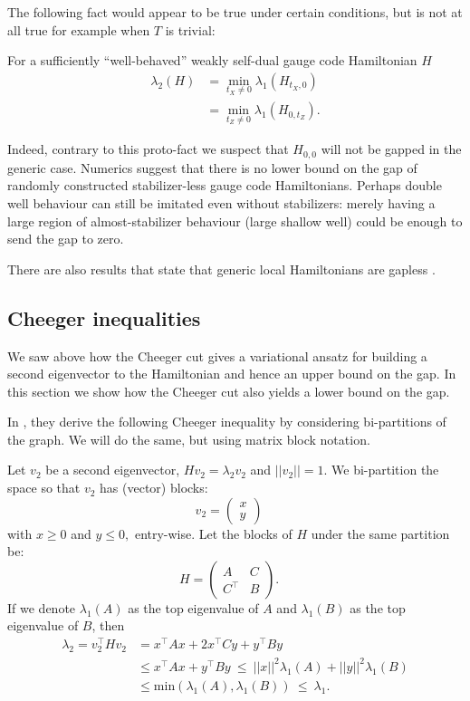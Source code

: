 \documentclass[11pt,oneside]{article}
\def\Ham{H}
\renewenvironment{framed}
{\begin{samepage}
\MakeFramed{\hsize0.8\linewidth\advance\hsize-\width\FrameRestore}}
{\endMakeFramed\end{samepage}}
\begin{document}
The following fact would appear to be true under certain conditions,
but is not at all true for example when $T$ is trivial:
\begin{framed}
For a sufficiently ``well-behaved''
weakly self-dual
gauge code Hamiltonian $H$
\begin{align*}
\lambda_2(\Ham) 
    &= \min_{t_X\ne 0} \lambda_1(\Ham_{t_X,0})\\
    &= \min_{t_Z\ne 0} \lambda_1(\Ham_{0,t_Z}).
\end{align*}
\end{framed}
Indeed, contrary to this proto-fact
we suspect that $H_{0,0}$ will not be gapped in
the generic case. 
Numerics suggest that
there is no lower bound on the gap of 
randomly constructed stabilizer-less gauge code Hamiltonians.
Perhaps double well behaviour can still be imitated even without
stabilizers: merely having a large region of almost-stabilizer
behaviour (large shallow well) could be enough to send the gap to zero.

There are also results that state that generic 
local Hamiltonians are gapless \cite{Movassagh2016}.

\subsection{Cheeger inequalities}

We saw above how the Cheeger cut gives a variational ansatz
for building a second eigenvector to the Hamiltonian and hence
an upper bound on the gap.
In this section we show how the Cheeger cut also 
yields a lower bound on the gap.

In \cite{Friedland2002}, they derive the following Cheeger inequality
by considering bi-partitions of the graph. We will do the
same, but using matrix block notation.

Let $v_2$ be a second eigenvector, $ \Ham v_2 = \lambda_2 v_2 $ 
and $||v_2||=1$.
We bi-partition the space 
so that $v_2$ has (vector) blocks:
$$
v_2 = \left( \begin{array}{l}
x\\
y\end{array} \right)\quad
$$
with $x\ge 0$ and $y\le 0,$ entry-wise.
Let the blocks of $\Ham$ under the same partition be:
$$
\Ham = \left( \begin{array}{ll}
A&C\\
C^\top&B\end{array} \right).\quad
$$
If we denote $\lambda_1(A)$ as the top eigenvalue of $A$ and
$\lambda_1(B)$ as the top eigenvalue of $B$,
then
\begin{align*}
\lambda_2 = v_2^\top \Ham v_2 &= x^\top A x + 2 x^\top C y + y^\top B y \\
        &\le x^\top A x + y^\top B y\ \le\ ||x||^2 \lambda_1(A) + ||y||^2 \lambda_1(B) \\
        &\le \mbox{min}(\lambda_1(A), \lambda_1(B))\ \le\ \lambda_1.
\end{align*}
\end{document}
